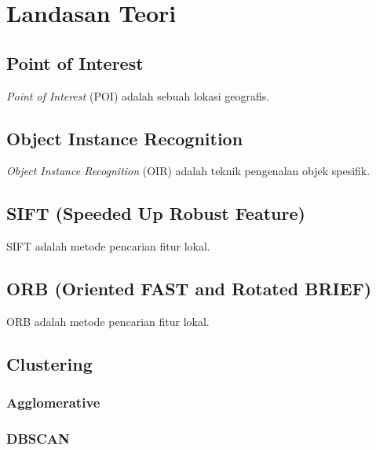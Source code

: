 \chapter{Landasan Teori}
\label{chap:landasan_teori}

\section{Point of Interest}
\label{sec:poi}

\textit{Point of Interest} (POI) adalah sebuah lokasi geografis.

\section{Object Instance Recognition}
\label{sec:oir}

\textit{Object Instance Recognition} (OIR) adalah teknik pengenalan objek spesifik.

\section{SIFT (Speeded Up Robust Feature)}
\label{sec:sift}

SIFT adalah metode pencarian fitur lokal.

\section{ORB (Oriented FAST and Rotated BRIEF)}
\label{sec:orb}

ORB adalah metode pencarian fitur lokal.

\section{Clustering}
\label{sec:clustering}

\subsection{Agglomerative}
\label{subsec:agglomerative}

\subsection{DBSCAN}
\label{subsec:dbscan}
